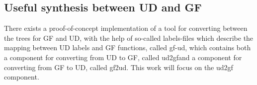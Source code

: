 









\subsection{Useful synthesis between UD and GF}



There exists a proof-of-concept implementation of a tool for converting between the trees for GF and UD,
with the help of so-called labels-files which describe the mapping between UD labels and GF functions,
called gf-ud, which contains both a component for converting from UD to GF, called ud2gf\cite{kolachina-ranta-2017}\footnotemark[1]
and a component for converting from GF to UD, called gf2ud\cite{kolachina-ranta-2016}\footnotemark[1]. This work will focus on the ud2gf component.


